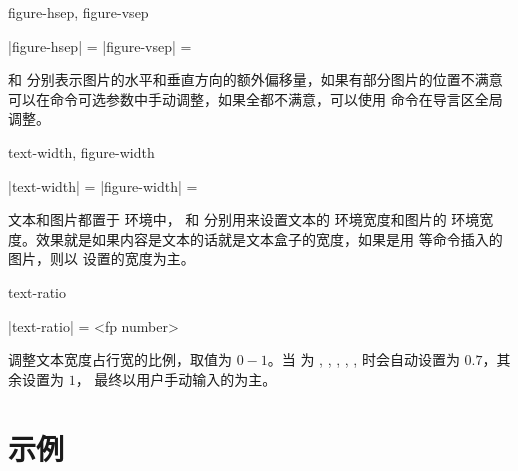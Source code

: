 \documentclass{l3doc}
\begin{document}
\begin{function}[added = 2022-01-23]{figure-hsep, figure-vsep}
  \begin{syntax}
    |figure-hsep| =  \init{0pt}
    |figure-vsep| =  \init{0pt}
  \end{syntax}
   和  分别表示图片的水平和垂直方向的额外偏移量，如果有部分图片的位置不满意可以在命令可选参数中手动调整，如果全都不满意，可以使用  命令在导言区全局调整。
\end{function}


\begin{function}[added = 2022-01-22]{text-width, figure-width}
  \begin{syntax}
    |text-width| =  \init{\hsize}
    |figure-width| =  \init{\hsize}
  \end{syntax}
  文本和图片都置于  环境中， 和  分别用来设置文本的  环境宽度和图片的  环境宽度。效果就是如果内容是文本的话就是文本盒子的宽度，如果是用  等命令插入的图片，则以  设置的宽度为主。
\end{function}


\begin{function}[added = 2022-01-22]{text-ratio}
  \begin{syntax}
    |text-ratio| = <fp number>
  \end{syntax}
  调整文本宽度占行宽的比例，取值为 $0-1$。当  为 , , , , ,  时会自动设置为 $0.7$，其余设置为 $1$， 最终以用户手动输入的为主。
\end{function}


\section{示例}

\end{document}
